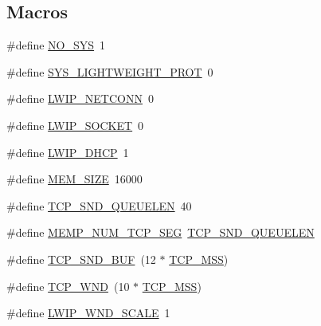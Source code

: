 \subsection*{Macros}
\begin{DoxyCompactItemize}
\item 
\#define \hyperlink{openmote-cc2538_2lwip_2test_2unit_2lwipopts_8h_ae00ba99de94a5bf84d832be8976df59b}{N\+O\+\_\+\+S\+YS}~1
\item 
\#define \hyperlink{openmote-cc2538_2lwip_2test_2unit_2lwipopts_8h_ae85efb3a5fcf8585c94b3c2669978959}{S\+Y\+S\+\_\+\+L\+I\+G\+H\+T\+W\+E\+I\+G\+H\+T\+\_\+\+P\+R\+OT}~0
\item 
\#define \hyperlink{openmote-cc2538_2lwip_2test_2unit_2lwipopts_8h_a478041b8544461258f6961bf0f3c1a77}{L\+W\+I\+P\+\_\+\+N\+E\+T\+C\+O\+NN}~0
\item 
\#define \hyperlink{openmote-cc2538_2lwip_2test_2unit_2lwipopts_8h_a1cb62ce61ac39d7d6728ae5d3d3b927f}{L\+W\+I\+P\+\_\+\+S\+O\+C\+K\+ET}~0
\item 
\#define \hyperlink{openmote-cc2538_2lwip_2test_2unit_2lwipopts_8h_a8a6ec62dc121064ac591b1fd8567bee9}{L\+W\+I\+P\+\_\+\+D\+H\+CP}~1
\item 
\#define \hyperlink{openmote-cc2538_2lwip_2test_2unit_2lwipopts_8h_a2dcf8c45f945dd0c4301a94700f2112c}{M\+E\+M\+\_\+\+S\+I\+ZE}~16000
\item 
\#define \hyperlink{openmote-cc2538_2lwip_2test_2unit_2lwipopts_8h_a9beaa47832ead4180981bfbf71074904}{T\+C\+P\+\_\+\+S\+N\+D\+\_\+\+Q\+U\+E\+U\+E\+L\+EN}~40
\item 
\#define \hyperlink{openmote-cc2538_2lwip_2test_2unit_2lwipopts_8h_aa35fb3a1a76661e3ffb9722a57092de3}{M\+E\+M\+P\+\_\+\+N\+U\+M\+\_\+\+T\+C\+P\+\_\+\+S\+EG}~\hyperlink{openmote-cc2538_2lwip_2test_2unit_2lwipopts_8h_a9beaa47832ead4180981bfbf71074904}{T\+C\+P\+\_\+\+S\+N\+D\+\_\+\+Q\+U\+E\+U\+E\+L\+EN}
\item 
\#define \hyperlink{openmote-cc2538_2lwip_2test_2unit_2lwipopts_8h_a871d111968d8c6c7880ff36b93c5c4dd}{T\+C\+P\+\_\+\+S\+N\+D\+\_\+\+B\+UF}~(12 $\ast$ \hyperlink{group__lwip__opts__tcp_gaf1ab7bb27860aa3677c387a2f3ba317b}{T\+C\+P\+\_\+\+M\+SS})
\item 
\#define \hyperlink{openmote-cc2538_2lwip_2test_2unit_2lwipopts_8h_a7f535a6efb5cdf86c3210e35ece1d6a7}{T\+C\+P\+\_\+\+W\+ND}~(10 $\ast$ \hyperlink{group__lwip__opts__tcp_gaf1ab7bb27860aa3677c387a2f3ba317b}{T\+C\+P\+\_\+\+M\+SS})
\item 
\#define \hyperlink{openmote-cc2538_2lwip_2test_2unit_2lwipopts_8h_a88dbbfeeeb41b129fdc8235fc08bb530}{L\+W\+I\+P\+\_\+\+W\+N\+D\+\_\+\+S\+C\+A\+LE}~1

\end{DoxyCompactItemize}
